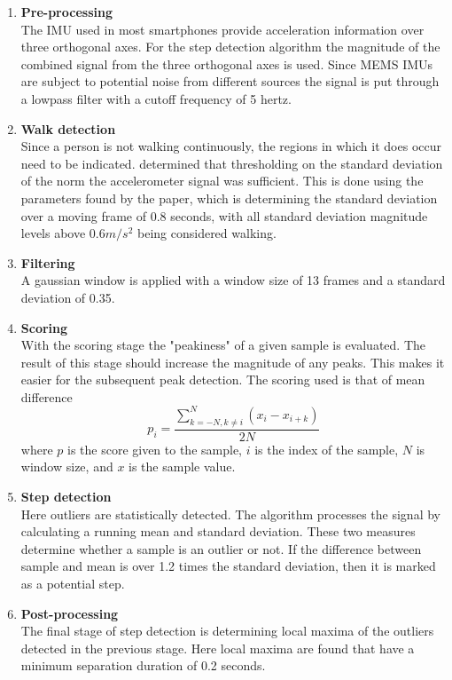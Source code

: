 \begin{enumerate}
	\item \textbf{Pre-processing} \\
	The IMU used in most smartphones provide acceleration information over three orthogonal axes. For the step detection algorithm the magnitude of the combined signal from the three orthogonal axes is used. Since MEMS IMUs are subject to potential noise from different sources  the signal is put through a lowpass filter with a cutoff frequency of 5 hertz.
	
	\item \textbf{Walk detection} \\
	Since a person is not walking continuously, the regions in which it does occur need to be indicated. \cite{Brajdic2013} determined that thresholding on the standard deviation of the norm the accelerometer signal was sufficient. This is done using the parameters found by the paper, which is determining the standard deviation over a moving frame of 0.8 seconds, with all standard deviation magnitude levels above $0.6 m/s^2$ being considered walking.
	
	\item \textbf{Filtering} \\
	A gaussian window is applied with a window size of 13 frames and a standard deviation of 0.35.
	
	\item \textbf{Scoring }\\
	With the scoring stage the "peakiness" of a given sample is evaluated. The result
	of this stage should increase the magnitude of any peaks. This makes it easier for the subsequent peak detection. The scoring used is that of mean difference 
	\begin{equation}
		p_{i}=\frac{\sum_{k=-N, k \neq i}^{N}\left(x_{i}-x_{i+k}\right)}{2 N}
		\label{eq:mean difference}
	\end{equation}
	where $p$ is the score given to the sample, $i$ is the index of the sample, $N$ is window size, and $x$ is the sample value.
	
	
	\item \textbf{Step detection} \\
	Here outliers are statistically detected. The algorithm processes the signal by calculating a running mean and standard deviation.
	These two measures determine whether a sample is an outlier or not. If the difference between sample and mean is over 1.2 times the standard deviation, then it is marked as a potential step.
	
	
	\item \textbf{Post-processing} \\
	The final stage of step detection is determining local maxima of the outliers detected in the previous stage. Here local maxima are found that have a minimum separation duration of 0.2 seconds.
	
\end{enumerate}

